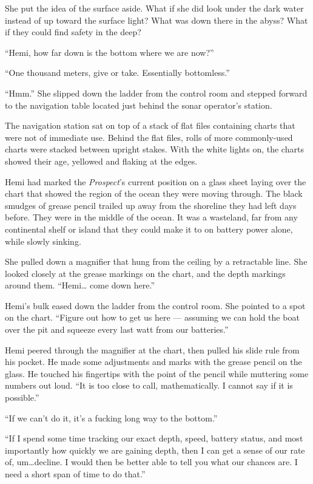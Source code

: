 \documentclass[
]{scrbook}
\begin{document}
She put the idea of the surface aside. What if she did look under the
dark water instead of up toward the surface light? What was down there
in the abyss? What if they could find safety in the deep?

``Hemi, how far down is the bottom where we are now?''

``One thousand meters, give or take. Essentially bottomless.''

``Hmm.'' She slipped down the ladder from the control room and stepped
forward to the navigation table located just behind the sonar operator's
station.

The navigation station sat on top of a stack of flat files containing
charts that were not of immediate use. Behind the flat files, rolls of
more commonly-used charts were stacked between upright stakes. With the
white lights on, the charts showed their age, yellowed and flaking at
the edges.

Hemi had marked the \emph{Prospect}'s current position on a glass sheet
laying over the chart that showed the region of the ocean they were
moving through. The black smudges of grease pencil trailed up away from
the shoreline they had left days before. They were in the middle of the
ocean. It was a wasteland, far from any continental shelf or island that
they could make it to on battery power alone, while slowly sinking.

She pulled down a magnifier that hung from the ceiling by a retractable
line. She looked closely at the grease markings on the chart, and the
depth markings around them. ``Hemi\ldots{} come down here.''

Hemi's bulk eased down the ladder from the control room. She pointed to
a spot on the chart. ``Figure out how to get us here --- assuming we can
hold the boat over the pit and squeeze every last watt from our
batteries.''

Hemi peered through the magnifier at the chart, then pulled his slide
rule from his pocket. He made some adjustments and marks with the grease
pencil on the glass. He touched his fingertips with the point of the
pencil while muttering some numbers out loud. ``It is too close to call,
mathematically. I cannot say if it is possible.''

``If we can't do it, it's a fucking long way to the bottom.''

``If I spend some time tracking our exact depth, speed, battery status,
and most importantly how quickly we are gaining depth, then I can get a
sense of our rate of, um\ldots decline. I would then be better able to
tell you what our chances are. I need a short span of time to do that.''
\end{document}
